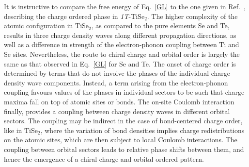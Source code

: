 \documentclass[aps,prl,twocolumn,superscriptaddress,groupedaddress]{revtex4}
\begin{document}
It is instructive to compare the free energy of Eq.~\eqref{GL} to the one given in Ref.~, describing the charge ordered phase in \emph{1T}-TiSe$_2$. The higher complexity of the atomic configuration in TiSe$_2$, as compared to the pure elements Se and Te, results in three charge density waves along different propagation directions, as well as a difference in strength of the electron-phonon coupling between Ti and Se sites. Nevertheless, the route to chiral charge and orbital order is largely the same as that observed in Eq.~\eqref{GL} for Se and Te. The onset of charge order is determined by terms that do not involve the phases of the individual charge density wave components. Instead, a term arising from the electron-phonon coupling favours values of the phases in individual sectors to be such that charge maxima fall on top of atomic sites or bonds. The on-site Coulomb interaction finally, provides a coupling between charge density waves in different orbital sectors. The coupling may be indirect in the case of bond-centered charge order, like in TiSe$_2$, where the variation of bond densities implies charge redistributions on the atomic sites, which are then subject to local Coulomb interactions. The coupling between orbital sectors leads to relative phase shifts between them, and hence the emergence of a chiral charge and orbital ordered pattern.
\end{document}

